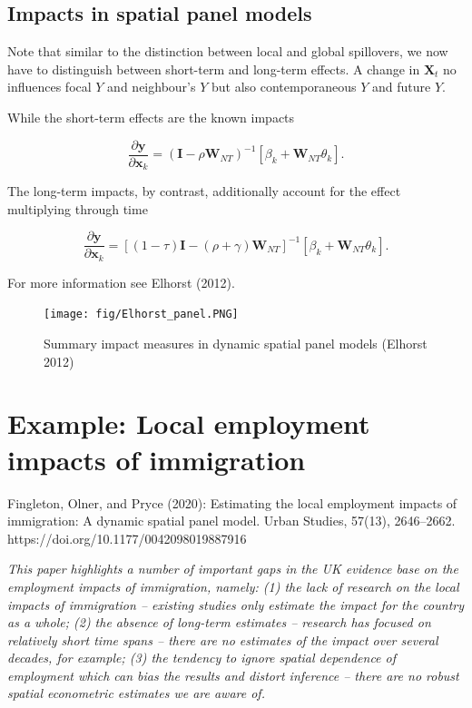 \documentclass[
  letterpaper,
  DIV=11,
  numbers=noendperiod]{scrreprt}
\begin{document}
\hypertarget{impacts-in-spatial-panel-models}{%
\subsection{Impacts in spatial panel
models}\label{impacts-in-spatial-panel-models}}

Note that similar to the distinction between local and global
spillovers, we now have to distinguish between short-term and long-term
effects. A change in \(\boldsymbol{\mathbf{X}}_t\) no influences focal
\(Y\) and neighbour's \(Y\) but also contemporaneous \(Y\) and future
\(Y\).

While the short-term effects are the known impacts

\[
\frac{\partial {\boldsymbol{\mathbf{y}}}}{\partial {\boldsymbol{\mathbf{x}}}_k} = ({\boldsymbol{\mathbf{I}}}-\rho{\boldsymbol{\mathbf{W}}_{NT}})^{-1}\left[\beta_k+{\boldsymbol{\mathbf{W}}_{NT}}\theta_k\right].
\]

The long-term impacts, by contrast, additionally account for the effect
multiplying through time

\[
\frac{\partial {\boldsymbol{\mathbf{y}}}}{\partial {\boldsymbol{\mathbf{x}}}_k} = [(1-\tau){\boldsymbol{\mathbf{I}}}-(\rho+\gamma){\boldsymbol{\mathbf{W}}_{NT}}]^{-1}\left[\beta_k+{\boldsymbol{\mathbf{W}}_{NT}}\theta_k\right].
\]

For more information see Elhorst (2012).

\begin{figure}

{\centering \texttt{[image: fig/Elhorst\_panel.PNG]}

}

\caption{Summary impact measures in dynamic spatial panel models
(Elhorst 2012)}

\end{figure}

\hypertarget{example-local-employment-impacts-of-immigration}{%
\section{Example: Local employment impacts of
immigration}\label{example-local-employment-impacts-of-immigration}}

Fingleton, Olner, and Pryce (2020): Estimating the local employment
impacts of immigration: A dynamic spatial panel model. Urban Studies,
57(13), 2646--2662. https://doi.org/10.1177/0042098019887916

\emph{This paper highlights a number of important gaps in the UK
evidence base on the employment impacts of immigration, namely: (1) the
lack of research on the local impacts of immigration -- existing studies
only estimate the impact for the country as a whole; (2) the absence of
long-term estimates -- research has focused on relatively short time
spans -- there are no estimates of the impact over several decades, for
example; (3) the tendency to ignore spatial dependence of employment
which can bias the results and distort inference -- there are no robust
spatial econometric estimates we are aware of.}
\end{document}
